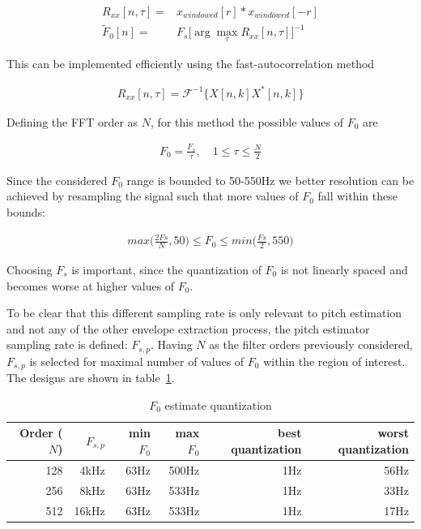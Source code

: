 \documentclass [11pt, proquest,oneside] {ganter_thesis}[2015/03/03]
\begin{document}
\begin{align}
R_{xx}[n,\tau] =& x_{windowed}[r] * x_{windowed}[-r] \\
\tilde{F}_0[n] =& F_s \Bigg[ \arg\max_\tau R_{xx}[n,\tau] \Bigg]^{-1}
\end{align}

This can be implemented efficiently using the fast-autocorrelation method

\begin{align}
R_{xx}[n,\tau] = \mathcal{F}^{-1}\Big\{X[n,k]X^*[n,k]\Big\}
\end{align}

Defining the FFT order as $N$, for this method the possible values of $F_0$ are 

\begin{align}
F_0 = \frac{F_s}{\tau}, \quad 1 \leq \tau \leq \frac{N}{2}
\end{align}

Since the considered $F_0$ range is bounded to 50-550Hz we better resolution can be achieved by resampling the signal such that more values of $F_0$ fall within these bounds:

\begin{align}
max\Big(\frac{2Fs}{N}, 50\Big) \leq F_0 \leq min\Big(\frac{Fs}{2}, 550\Big)
\end{align}

Choosing $F_s$ is important, since the quantization of $F_0$ is not linearly spaced and becomes worse at higher values of $F_0$.

To be clear that this different sampling rate is only relevant to pitch estimation and not any of the other envelope extraction process, the pitch estimator sampling rate is defined: $F_{s,p}$.  Having $N$ as the filter orders previously considered, $F_{s,p}$ is selected for maximal number of values of $F_0$ within the region of interest.  The designs are shown in table~\ref{table:f0_quantization}.

\begin{table}
\begin{center}
\begin{tabular}{| r | r | r | r | r | r |}
  \hline
  \textbf{Order ($N$)} & \textbf{$F_{s,p}$} &  \textbf{min $F_0$} & \textbf{max $F_0$} &  \textbf{best quantization} &  \textbf{worst quantization} \\ \hline
  128 & 4kHz & 63Hz & 500Hz & 1Hz & 56Hz \\ \hline
  256 & 8kHz & 63Hz & 533Hz & 1Hz & 33Hz \\ \hline
  512 & 16kHz & 63Hz & 533Hz & 1Hz & 17Hz \\ \hline
\end{tabular}
\end{center}
\caption{$F_0$ estimate quantization}\label{table:f0_quantization}
\end{table}
\end{document}
